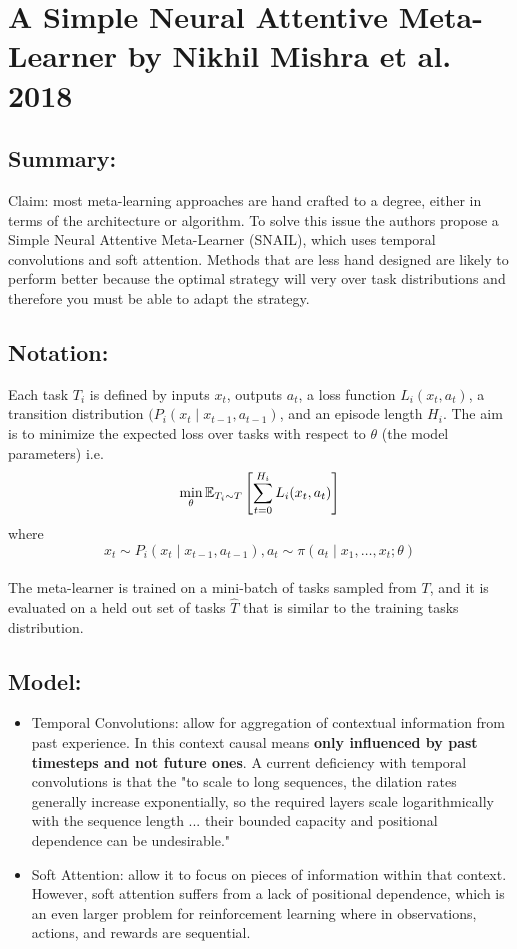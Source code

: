 \section{A Simple Neural Attentive Meta-Learner by Nikhil Mishra et al. 2018}

\subsection{Summary:}
Claim: most meta-learning approaches are hand crafted to a degree, either in terms of the 
architecture or algorithm. To solve this issue the authors propose a Simple Neural Attentive
Meta-Learner (SNAIL), which uses temporal convolutions and soft attention. Methods that are less 
hand designed are likely to perform better because the optimal strategy will very over task distributions
and therefore you must be able to adapt the strategy. 

\subsection{Notation:}

Each task $T_i$ is defined by inputs $x_t$, outputs $a_t$, a loss function $L_i(x_t, a_t)$, a
transition distribution $(P_i(x_t \mid x_{t - 1}, a_{t - 1})$, and an episode length $H_i$.
The aim is to minimize the expected loss over tasks with respect to $\theta$ (the model parameters) i.e.
$$\min_\theta {\mathbb E}_{T_i \sim T}\left[ \sum_{t = 0}^{H_i} L_i(x_t, a_t) \right]$$
where
$$x_t \sim P_i(x_t \mid x_{t - 1}, a_{t - 1}), a_t \sim \pi(a_t \mid x_1, \dots, x_t ; \theta)$$ \\

The meta-learner is trained on a mini-batch of tasks sampled from $T$, and it is evaluated on a held out
set of tasks $\hat T$ that is similar to the training tasks distribution.

\subsection{Model:}

\begin{itemize}
\item Temporal Convolutions: allow for aggregation of contextual information from past experience. In this
context causal means \textbf{only influenced by past timesteps and not future ones}. A current deficiency 
with temporal convolutions is that the "to scale to long sequences, the dilation rates generally increase
exponentially, so the required layers scale logarithmically with the sequence length ... their bounded 
capacity and positional dependence can be undesirable."

\item Soft Attention: allow it to focus on pieces of information within that context. However, 
      soft attention suffers from a lack of positional dependence, which is an even larger problem
      for reinforcement learning where in observations, actions, and rewards are sequential. 
\end{itemize}



